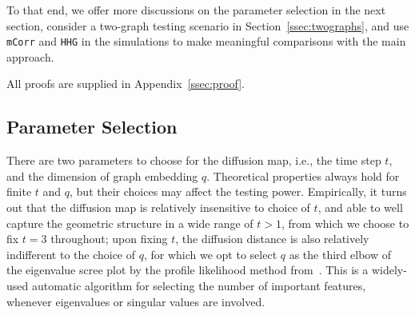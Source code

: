 \documentclass[12pt]{article}
\theoremstyle{definition}
\begin{document}
	To that end, we offer more discussions on the parameter selection in the next section, consider a two-graph testing scenario in Section~\ref{ssec:twographs}, and use \texttt{mCorr} and \texttt{HHG} in the simulations to make meaningful comparisons with the main approach.
	
	All proofs are supplied in Appendix~\ref{ssec:proof}.
	
	\subsection{Parameter Selection}
	\label{ss:dis}
	
	There are two parameters to choose for the diffusion map, i.e., the time step $t$, and the dimension of graph embedding $q$. Theoretical properties always hold for finite $t$ and $q$, but their choices may affect the testing power. Empirically, it turns out that the diffusion map is relatively insensitive to choice of $t$, and able to well capture the geometric structure in a wide range of $t>1$, from which we choose to fix $t=3$ throughout; upon fixing $t$, the diffusion distance is also relatively indifferent to the choice of $q$, for which we opt to select $q$ as the third elbow of the eigenvalue scree plot by the profile likelihood method from~\cite{ZhuGhodsi2006}. This is a widely-used automatic algorithm for selecting the number of important features, whenever eigenvalues or singular values are involved. 
	
\end{document}
